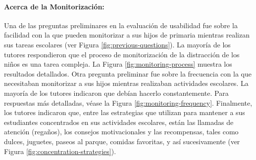 \documentclass[a4paper,fleqn]{cas-sc}
\begin{document}
					\paragraph{\textbf{Acerca de la Monitorización:}}
						Una de las preguntas preliminares en la evaluación de usabilidad fue sobre la facilidad con la que pueden monitorizar a sus hijos de primaria mientras realizan sus tareas escolares (ver Figura \ref{fig:previous-questions}). La mayoría de los tutores respondieron que el proceso de monitorización de la distracción de los niños es una tarea compleja. La Figura \ref{fig:monitoring-process} muestra los resultados detallados. Otra pregunta preliminar fue sobre la frecuencia con la que necesitaban monitorizar a sus hijos mientras realizaban actividades escolares. La mayoría de los tutores indicaron que debían hacerlo constantemente. Para respuestas más detalladas, véase la Figura \ref{fig:monitoring-frequency}. Finalmente, los tutores indicaron que, entre las estrategias que utilizan para mantener a sus estudiantes concentrados en sus actividades escolares, están las llamadas de atención (regaños), los consejos motivacionales y las recompensas, tales como dulces, juguetes, paseos al parque, comidas favoritas, y así sucesivamente (ver Figura \ref{fig:concentration-strategies}).
						
\end{document}
